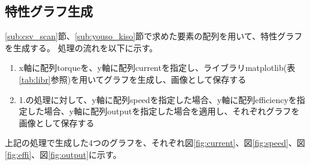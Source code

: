 \subsection{特性グラフ生成}\label{sub:toku_gurahu}
\ref{sub:csv_scan}節、\ref{sub:youso_kiso}節で求めた要素の配列を用いて、特性グラフを生成する。
処理の流れを以下に示す。
\begin{enumerate}
    \item x軸に配列torqueを、y軸に配列currentを指定し、ライブラリmatplotlib(表\ref{tab:libr}参照)を用いてグラフを生成し、画像として保存する
    \item 1.の処理に対して、y軸に配列speedを指定した場合、y軸に配列efficiencyを指定した場合、y軸に配列outputを指定した場合を適用し、それぞれグラフを画像として保存する
\end{enumerate}
上記の処理で生成した4つのグラフを、それぞれ図\ref{fig:current}、図\ref{fig:speed}、図\ref{fig:effi}、図\ref{fig:output}に示す。

